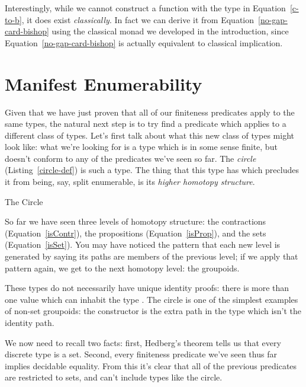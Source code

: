 Interestingly, while we cannot construct a function with the type in
Equation~\ref{c-to-b}, it does exist \emph{classically}.
In fact we can derive it from Equation~\ref{no-gap-card-bishop} using
the classical monad we developed in the introduction, since
Equation~\ref{no-gap-card-bishop} is actually equivalent to classical
implication.
\begin{agdalisting*}
\end{agdalisting*}
\section{Manifest Enumerability} \label{manifest-enumerability}
Given that we have just proven that all of our finiteness predicates apply to
the same types, the natural next step is to try find a predicate which applies
to a different class of types.
Let's first talk about what this new class of types might look like:
what we're looking for is a type which is in some sense finite, but doesn't
conform to any of the predicates we've seen so far.
The \emph{circle} (Listing~\ref{circle-def}) is such a type.
The thing that this type has which precludes it from being, say, split
enumerable, is its \emph{higher homotopy structure}.

\begin{marginagdalisting}{The Circle} \label{circle-def}
\end{marginagdalisting}


So far we have seen three levels of homotopy structure: the contractions
(Equation~\ref{isContr}), the propositions (Equation~\ref{isProp}), and the sets
(Equation~\ref{isSet}).
You may have noticed the pattern that each new level is generated by saying its
paths are members of the previous level; if we apply that pattern again, we get
to the next homotopy level: the groupoids.
\begin{agdalisting}
\end{agdalisting}
These types do not necessarily have unique identity proofs: there is more than
one value which can inhabit the type .
The circle is one of the simplest examples of non-set groupoids: the constructor
 is the extra path in the type which isn't the
identity path.

We now need to recall two facts: first, Hedberg's theorem tells us that every
discrete type is a set.
Second, every finiteness predicate we've seen thus far implies decidable
equality.
From this it's clear that all of the previous predicates are restricted to sets,
and can't include types like the circle.

